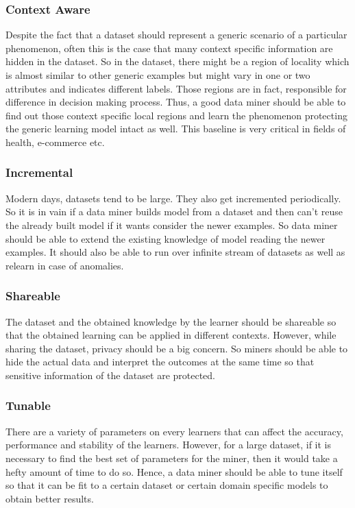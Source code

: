 \documentclass[sigplan]{acmart}\settopmatter{printfolios=true,printccs=false,printacmref=false}
\begin{document}
\subsubsection{Context Aware}
Despite the fact that a dataset should represent a generic scenario of a particular phenomenon, often this is the case that many context specific information are hidden in the dataset. So in the dataset, there might be a region of locality which is almost similar to other generic examples but might vary in one or two attributes and indicates different labels. Those regions are in fact, responsible for difference in decision making process. Thus, a good data miner should be able to find out those context specific local regions and learn the phenomenon protecting the generic learning model intact as well. This baseline is very critical in fields of health, e-commerce etc.

\subsubsection{Incremental}
Modern days, datasets tend to be large. They also get incremented periodically. So it is in vain if a data miner builds model from a dataset and then can't reuse the already built model if it wants consider the newer examples. So data miner should be able to extend the existing knowledge of model reading the newer examples. It should also be able to run over infinite stream of datasets as well as relearn in case of anomalies. 

\subsubsection{Shareable}
The dataset and the obtained knowledge by the learner should be shareable so that the obtained learning can be applied in different contexts. However, while sharing the dataset, privacy should be a big concern. So miners should be able to hide the actual data and interpret the outcomes at the same time so that sensitive information of the dataset are protected. 

\subsubsection{Tunable}
There are a variety of parameters on every learners that can affect the accuracy, performance and stability of the learners. However, for a large dataset, if it is necessary to find the best set of parameters for the miner, then it would take a hefty amount of time to do so. Hence, a data miner should be able to tune itself so that it can be fit to a certain dataset or certain domain specific models to obtain better results. 
\end{document}

